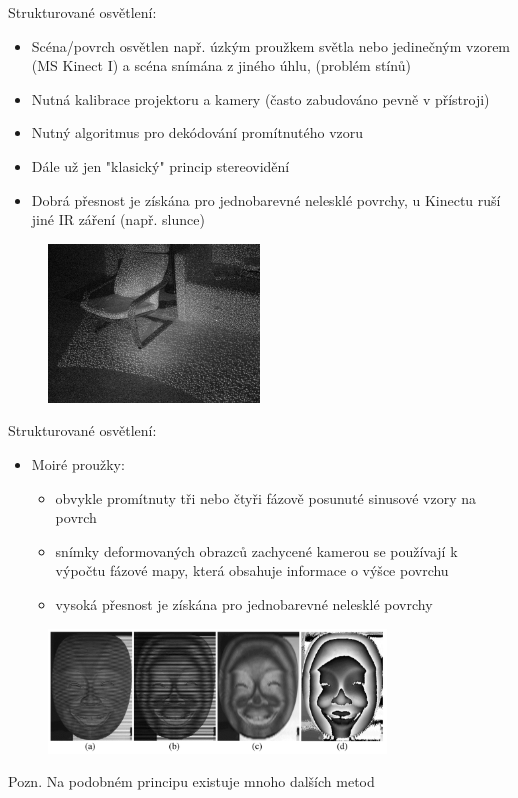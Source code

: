 \begin{frame}
Strukturované osvětlení:
\begin{itemize}
\item Scéna/povrch osvětlen např. úzkým proužkem světla nebo jedinečným vzorem (MS Kinect I) a scéna snímána z jiného úhlu,  (problém stínů)
\item Nutná kalibrace projektoru a kamery (často zabudováno pevně v přístroji)
\item Nutný algoritmus pro dekódování promítnutého vzoru
\item Dále už jen "klasický" princip stereovidění
\item Dobrá přesnost je získána pro jednobarevné nelesklé povrchy, u Kinectu ruší jiné IR záření (např. slunce)
\end{itemize}
    \begin{figure}[!ht]
	\centering
	\includegraphics[width = 0.5\textwidth]{./kinect1}
	\end{figure}
\end{frame}

\begin{frame}
Strukturované osvětlení:
\begin{itemize}
\item Moiré  proužky:
    \begin{itemize}
    \item obvykle promítnuty tři nebo čtyři fázově posunuté sinusové vzory na povrch 
    \item snímky deformovaných obrazců zachycené kamerou se používají k výpočtu fázové mapy, která obsahuje informace o výšce povrchu
    \item vysoká přesnost je získána pro jednobarevné nelesklé povrchy
    \end{itemize}
\end{itemize}
	\begin{figure}[!ht]
	\centering
	\includegraphics[width = 0.8\textwidth]{./moire}
	\end{figure}
Pozn. Na podobném principu existuje mnoho dalších metod 
\end{frame}



